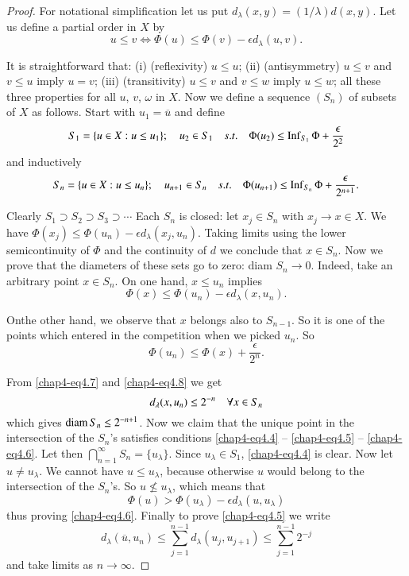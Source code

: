 \begin{proof}
For notational simplification let us put
$d_{\lambda}(x,y)=(1/\lambda)d(x,y)$. Let us define a partial order in
$X$ by
$$
u\leq v\Longleftrightarrow \Phi(u)\leq \Phi(v)-\epsilon d_{\lambda}(u,v).
$$

It is straightforward that: (i) (reflexivity) $u\leq u$; (ii)
(antisymmetry) $u\leq v$ and $v\leq u$ imply $u=v$; (iii)
(transitivity) $u\leq v$ and $v\leq w$ imply $u\leq w$; all these
three properties for all $u$, $v$, $\omega$ in $X$. Now we define a
sequence $(S_{n})$ of subsets of $X$ as follows. Start with
$u_{1}=\overline{u}$ and define
$$
S_{1}=\{u\in X:u\leq u_{1}\};\quad u_{2}\in S_{1}\quad s.t.\quad
\Phi(u_{2})\leq \operatorname{Inf}_{S_{1}}\Phi+\frac{\epsilon}{2^{2}}
$$ 
and inductively
$$
S_{n}=\{u\in X:u\leq u_{n}\};\quad u_{n+1}\in S_{n}\quad s.t.\quad
\Phi(u_{n+1})\leq \operatorname{Inf}_{S_{n}}\Phi+\frac{\epsilon}{2^{n+1}}. 
$$

Clearly $S_{1}\supset S_{2}\supset S_{3}\supset\cdots$ Each $S_{n}$ is
closed: let $x_{j}\in S_{n}$ with $x_{j}\to x\in X$. We have
$\Phi(x_{j})\leq \Phi(u_{n})-\epsilon
d_{\lambda}(x_{j},u_{n})$. Taking limits using the lower
semicontinuity of $\Phi$ and the continuity of $d$ we conclude that
$x\in S_{n}$. Now we prove that the diameters of these sets go to
zero: diam $S_{n}\to 0$. Indeed, take an arbitrary point $x\in
S_{n}$. On one hand, $x\leq u_{n}$ implies
\begin{equation*}
\Phi(x)\leq \Phi(u_{n})-\epsilon
d_{\lambda}(x,u_{n}).\tag{4.7}\label{chap4-eq4.7} 
\end{equation*}

On\pageoriginale the other hand, we observe that $x$ belongs also to
$S_{n-1}$. So 
it is one of the points which entered in the competition when we
picked $u_{n}$. So 
\begin{equation*}
\Phi(u_{n})\leq
\Phi(x)+\frac{\epsilon}{2^{n}}.\tag{4.8}\label{chap4-eq4.8} 
\end{equation*}

From \eqref{chap4-eq4.7} and \eqref{chap4-eq4.8} we get
$$
d_{\lambda}(x,u_{n})\leq 2^{-n}\quad \forall x\in S_{n}
$$
which gives $\operatorname{diam} S_{n}\leq 2^{-n+1}$. Now we claim that the unique
point in the intersection of the $S_{n}$'s satisfies conditions
\eqref{chap4-eq4.4} -- \eqref{chap4-eq4.5} -- \eqref{chap4-eq4.6}. Let
then $\bigcap\limits^{\infty}_{n=1}S_{n}=\{u_{\lambda}\}$. Since $u_{\lambda}\in
S_{1}$, \eqref{chap4-eq4.4} is clear. Now let $u\neq u_{\lambda}$. We
cannot have $u\leq u_{\lambda}$, because otherwise $u$ would belong to
the intersection of the $S_{n}$'s. So $u\nleq u_{\lambda}$, which
means that 
$$
\Phi(u)>\Phi(u_{\lambda})-\epsilon d_{\lambda}(u,u_{\lambda})
$$
thus proving \eqref{chap4-eq4.6}. Finally to prove \eqref{chap4-eq4.5}
we write
$$
d_{\lambda}(\overline{u},u_{n})\leq
\sum\limits^{n-1}_{j=1}d_{\lambda}(u_{j},u_{j+1})\leq
\sum\limits^{n-1}_{j=1}2^{-j} 
$$
and take limits as $n\to \infty$. 
\end{proof}

